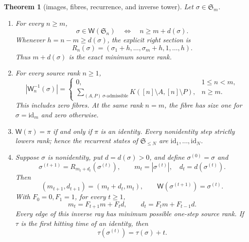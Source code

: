 \documentclass[a4paper,10pt]{amsart}
\newtheorem{theorem}{Theorem}
\theoremstyle{remark}
\newcommand{\Sym}{\mathfrak S}
\newcommand{\WEX}{\mathsf W}
\begin{document}
\begin{theorem}[images, fibres, recurrence, and inverse tower]\label{thm:main}
Let $\sigma\in\Sym_m$.
\begin{enumerate}
\item\label{it:image}
For every $n\ge m$,
\begin{equation}\label{eq:image}
 \sigma\in\WEX(\Sym_n)\quad\Longleftrightarrow\quad
 n\ge m+d(\sigma).
\end{equation}
Whenever $h=n-m\ge d(\sigma)$, the explicit right section is
\begin{equation}\label{eq:section}
 R_n(\sigma)=(\sigma_1+h,\ldots,\sigma_m+h,1,\ldots,h).
\end{equation}
Thus $m+d(\sigma)$ is the exact minimum source rank.
\item\label{it:fibre}
For every source rank \(n\ge1\),
\begin{equation}\label{eq:fibre}
 |\WEX_n^{-1}(\sigma)|
 =\begin{cases}
 0,&1\le n<m,\\
 \displaystyle\sum_{(A,P)\ \sigma\text{-admissible}}
 K([n]\setminus A,[n]\setminus P),&n\ge m.
 \end{cases}
\end{equation}
This includes zero fibres.  At the same rank \(n=m\), the fibre has size one
for \(\sigma=\mathrm{id}_m\) and zero otherwise.
\item\label{it:recurrent}
$\WEX(\pi)=\pi$ if and only if $\pi$ is an identity.  Every
nonidentity step strictly lowers rank; hence the recurrent states of
$\Sym_{\le N}$ are $\mathrm{id}_1,\ldots,\mathrm{id}_N$.
\item\label{it:tower}
Suppose $\sigma$ is nonidentity, put $d=d(\sigma)>0$, and define
$\sigma^{(0)}=\sigma$ and
\begin{equation}\label{eq:canonical}
 \sigma^{(t+1)}=R_{m_t+d_t}(\sigma^{(t)}),
 \qquad m_t=|\sigma^{(t)}|,\quad d_t=d(\sigma^{(t)}).
\end{equation}
Then
\begin{equation}\label{eq:update}
 (m_{t+1},d_{t+1})=(m_t+d_t,m_t),
 \qquad \WEX(\sigma^{(t+1)})=\sigma^{(t)}.
\end{equation}
With $F_0=0,F_1=1$, for every $t\ge1$,
\begin{equation}\label{eq:fibonacci}
 m_t=F_{t+1}m+F_t d,\qquad
 d_t=F_t m+F_{t-1}d.
\end{equation}
Every edge of this inverse ray has minimum possible one-step source rank.  If
$\tau$ is the first hitting time of an identity, then
\begin{equation}\label{eq:tail-shift}
 \tau(\sigma^{(t)})=\tau(\sigma)+t.
\end{equation}
\end{enumerate}
\end{theorem}
\end{document}
